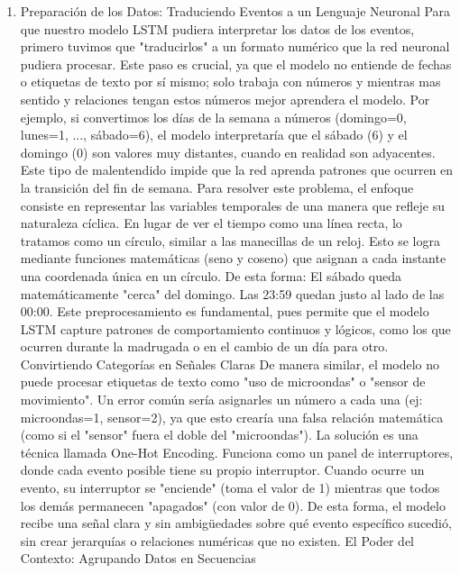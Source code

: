 \begin{enumerate}
        \begin{enumerate}
          \item Preparación de los Datos: Traduciendo Eventos a un Lenguaje Neuronal
                Para que nuestro modelo LSTM pudiera interpretar los datos de los eventos, primero tuvimos que "traducirlos" a un formato numérico que la red neuronal pudiera procesar. Este paso es crucial, ya que el modelo no entiende de fechas o etiquetas de texto por sí mismo; solo trabaja con números y mientras mas sentido y relaciones tengan estos números mejor aprendera el modelo.
                Por ejemplo, si convertimos los días de la semana a números (domingo=0, lunes=1, ..., sábado=6), el modelo interpretaría que el sábado (6) y el domingo (0) son valores muy distantes, cuando en realidad son adyacentes. Este tipo de malentendido impide que la red aprenda patrones que ocurren en la transición del fin de semana.
                Para resolver este problema, el enfoque consiste en representar las variables temporales de una manera que refleje su naturaleza cíclica. En lugar de ver el tiempo como una línea recta, lo tratamos como un círculo, similar a las manecillas de un reloj. Esto se logra mediante funciones matemáticas (seno y coseno) que asignan a cada instante una coordenada única en un círculo. De esta forma:
                El sábado queda matemáticamente "cerca" del domingo.
                Las 23:59 quedan justo al lado de las 00:00.
                Este preprocesamiento es fundamental, pues permite que el modelo LSTM capture patrones de comportamiento continuos y lógicos, como los que ocurren durante la madrugada o en el cambio de un día para otro.
                Convirtiendo Categorías en Señales Claras
                De manera similar, el modelo no puede procesar etiquetas de texto como "uso de microondas" o "sensor de movimiento". Un error común sería asignarles un número a cada una (ej: microondas=1, sensor=2), ya que esto crearía una falsa relación matemática (como si el "sensor" fuera el doble del "microondas").
                La solución es una técnica llamada One-Hot Encoding. Funciona como un panel de interruptores, donde cada evento posible tiene su propio interruptor.
                Cuando ocurre un evento, su interruptor se "enciende" (toma el valor de 1) mientras que todos los demás permanecen "apagados" (con valor de 0). De esta forma, el modelo recibe una señal clara y sin ambigüedades sobre qué evento específico sucedió, sin crear jerarquías o relaciones numéricas que no existen.
                El Poder del Contexto: Agrupando Datos en Secuencias

\end{enumerate}
\end{enumerate}
